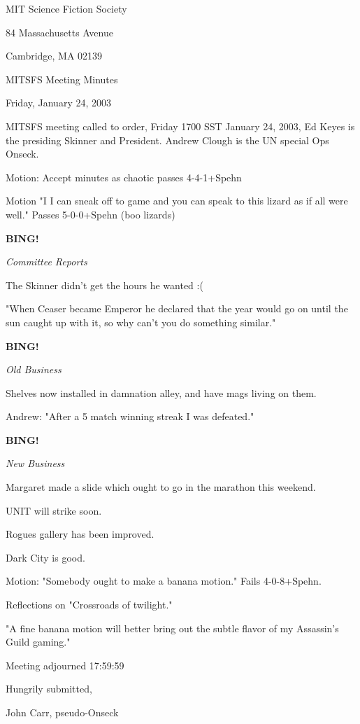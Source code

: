 \documentclass[12pt]{article}
\newcommand{\bing}{{\bf BING!} }
\newcommand{\goto}[1]{\bing \vskip 12pt \centerline{{\em{#1}}}}
\begin{document}
\begin{center}

MIT Science Fiction Society 

84 Massachusetts Avenue

Cambridge, MA 02139

\vspace{12pt}

MITSFS Meeting Minutes 

Friday, January 24, 2003

\end{center}
 
\vspace{18pt}

\setlength{\parskip}{6pt}

\noindent
MITSFS meeting called to order, Friday 1700 SST January 24, 2003, Ed Keyes is the presiding Skinner and President.  Andrew Clough is the UN special Ops Onseck.

Motion:  Accept minutes as chaotic passes 4-4-1+Spehn

Motion "I I can sneak off to game and you can speak to this lizard as if all were well."  Passes 5-0-0+Spehn (boo lizards)

\goto{Committee Reports}

The Skinner didn't get the hours he wanted :(

"When Ceaser became Emperor he declared that the year would go on until the sun caught up with it, so why can't you do something similar."

\goto{Old Business}

Shelves now installed in damnation alley, and have mags living on them.

Andrew: "After a 5 match winning streak I was defeated."

\goto{New Business}

Margaret made a slide which ought to go in the marathon this weekend.

UNIT will strike soon.

Rogues gallery has been improved.

Dark City is good.

Motion:  "Somebody ought to make a banana motion."  Fails 4-0-8+Spehn.

Reflections on "Crossroads of twilight."

"A fine banana motion will better bring out the subtle flavor of my Assassin's Guild gaming."

\vspace{12pt}

\noindent
Meeting adjourned 17:59:59

\vspace{18pt}

\centerline{Hungrily submitted,}
\centerline{John Carr, pseudo-Onseck}
\end{document}
